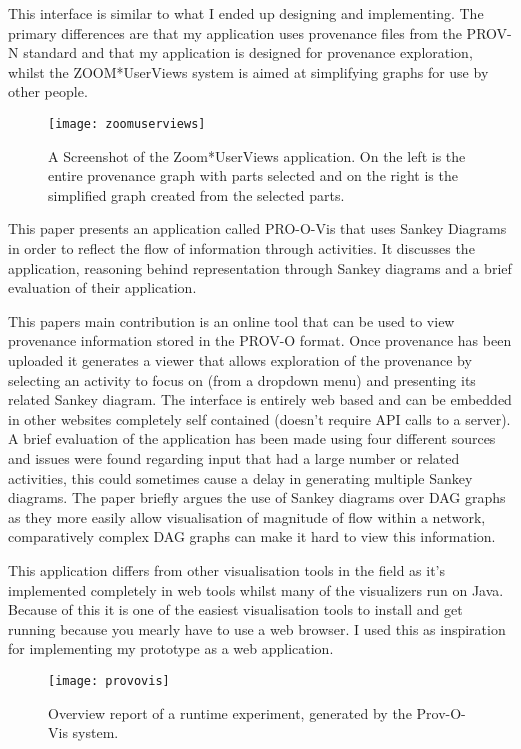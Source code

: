 This interface is similar to what I ended up designing and implementing. The primary differences are that my application uses provenance files from the PROV-N standard and that my application is designed for provenance exploration, whilst the ZOOM*UserViews system is aimed at simplifying graphs for use by other people.

\begin{figure}[h]
	\centering
	\texttt{[image: zoomuserviews]}
	\caption{A Screenshot of the Zoom*UserViews application. On the left is the entire provenance graph with parts selected and on the right is the simplified graph created from the selected parts.}
	\label{fig:zoomuserviews}
\end{figure}



This paper presents an application called PRO-O-Vis that uses Sankey Diagrams in order to reflect the flow of information through activities. It discusses the application, reasoning behind representation through Sankey diagrams and a brief evaluation of their application.

This papers main contribution is an online tool that can be used to view provenance information stored in the PROV-O format. Once provenance has been uploaded it generates a viewer that allows exploration of the provenance by selecting an activity to focus on (from a dropdown menu) and presenting its related Sankey diagram. The interface is entirely web based and can be embedded in other websites completely self contained (doesn't require API calls to a server). A brief evaluation of the application has been made using four different sources and issues were found regarding input that had a large number or related activities, this could sometimes cause a delay in generating multiple Sankey diagrams. The paper briefly argues the use of Sankey diagrams over DAG graphs as they more easily allow visualisation of magnitude of flow within a network, comparatively complex DAG graphs can make it hard to view this information.

This application differs from other visualisation tools in the field as it's implemented completely in web tools whilst many of the visualizers run on Java. Because of this it is one of the easiest visualisation tools to install and get running because you mearly have to use a web browser. I used this as inspiration for implementing my prototype as a web application. 

\begin{figure}[h]
	\centering
	\texttt{[image: provovis]}
\caption{Overview report of a runtime experiment, generated by the Prov-O-Vis system.}
	\label{fig:provovis}
\end{figure}

